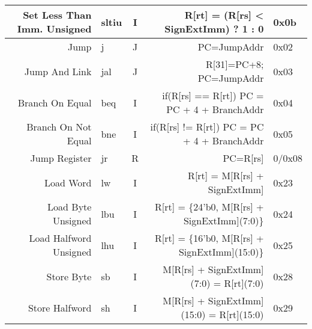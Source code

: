 \begin{tabularx}{\textwidth}{NMcDO}
    Set Less Than Imm. Unsigned                         & sltiu                                    & I & R[rt] = (R[rs] < SignExtImm) ? 1 : 0                             \footnotemark[2]\footnotemark[6] & 0x0b   \\
    \midrule
    Jump                                                & j                                        & J & PC=JumpAddr                                                      \footnotemark[5]                 & 0x02   \\
    Jump And Link                                       & jal                                      & J & R[31]=PC+8; PC=JumpAddr                                          \footnotemark[5]                 & 0x03   \\
    Branch On Equal                                     & beq                                      & I & if(R[rs] == R[rt]) PC = PC + 4 + BranchAddr                      \footnotemark[4]                 & 0x04   \\
    Branch On Not Equal                                 & bne                                      & I & if(R[rs] != R[rt]) PC = PC + 4 + BranchAddr                      \footnotemark[4]                 & 0x05   \\
    Jump Register                                       & jr                                       & R & PC=R[rs]                                                                                          & 0/0x08 \\
    \midrule
    Load Word                                           & lw                                       & I & R[rt] = M[R[rs] + SignExtImm]                                    \footnotemark[2]                 & 0x23   \\
    Load Byte Unsigned                                  & lbu                                      & I & R[rt] = \{24'b0, M[R[rs] + SignExtImm](7:0)\}                    \footnotemark[2]                 & 0x24   \\
    Load Halfword Unsigned                              & lhu                                      & I & R[rt] = \{16'b0, M[R[rs] + SignExtImm](15:0)\}                   \footnotemark[2]                 & 0x25   \\
    Store Byte                                          & sb                                       & I & M[R[rs] + SignExtImm](7:0) = R[rt](7:0)                          \footnotemark[2]                 & 0x28   \\
    Store Halfword                                      & sh                                       & I & M[R[rs] + SignExtImm](15:0) = R[rt](15:0)                        \footnotemark[2]                 & 0x29   \\

\end{tabularx}
